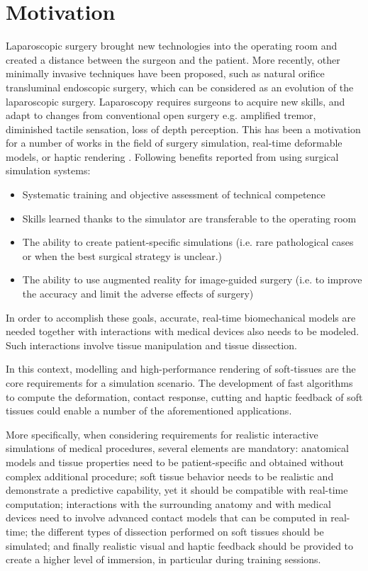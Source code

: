 \section{Motivation}
Laparoscopic surgery brought new technologies into the operating room and created a 
distance between the surgeon and the patient. More recently, other minimally invasive techniques have 
been proposed, such as natural orifice transluminal endoscopic surgery, which can be considered as an 
evolution of the laparoscopic surgery. Laparoscopy requires surgeons to acquire new skills, and adapt 
to changes from conventional open surgery e.g. amplified tremor, diminished tactile sensation, loss of 
depth perception. This has been a motivation for a number of works in the field of surgery simulation, 
real-time deformable models, or haptic rendering \cite{Lin2004}. Following benefits reported from 
using surgical simulation systems:

\begin{itemize}
 \item Systematic training and objective assessment of technical competence
 \item Skills learned thanks to the simulator are transferable to the operating room
 \item The ability to create patient-specific simulations (i.e. rare pathological cases or when the best surgical strategy is unclear.)
 \item The ability to use augmented reality for image-guided surgery (i.e. to improve the accuracy and limit the adverse effects of surgery)
\end{itemize}

In order to accomplish these goals, accurate, real-time biomechanical models are needed together
with interactions with medical devices also needs to be modeled.
Such interactions involve tissue manipulation and tissue dissection. 

In this context, modelling and high-performance rendering of soft-tissues are the core requirements for 
a simulation scenario. The development of fast algorithms to compute the deformation, contact response, 
cutting and haptic feedback of soft tissues could enable a number of the aforementioned applications.

More specifically, when considering requirements for realistic interactive simulations of medical procedures, 
several elements are mandatory: anatomical models and tissue properties need to be patient-specific and 
obtained without complex additional procedure; soft tissue behavior needs to be realistic and 
demonstrate a predictive capability, yet it should be compatible with real-time computation; interactions with the surrounding anatomy and with medical 
devices need to involve advanced contact models that can be computed in real-time; the different types of dissection performed on soft tissues should be 
simulated; and finally realistic visual and haptic feedback should be provided to create a higher level of immersion, in particular during training sessions.

